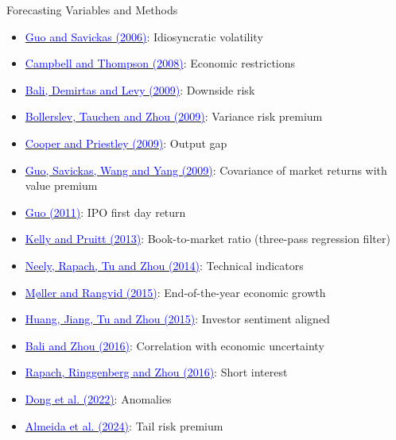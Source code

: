 \documentclass{beamer}
\begin{document}
\begin{frame}[allowframebreaks]{Forecasting Variables and Methods}
	\begin{itemize}
		\item \href{https://doi.org/10.1016/j.jfineco.2005.10.003}{\textcolor{blue}{Guo and Savickas (2006)}}: Idiosyncratic volatility
        \item \href{https://doi.org/10.1093/rfs/hhm055}{\textcolor{blue}{Campbell and Thompson (2008)}}: Economic restrictions
		\item \href{https://doi.org/10.1016/j.jfineco.2008.02.011}{\textcolor{blue}{Bali, Demirtas and Levy (2009)}}: Downside risk
		\item \href{https://doi.org/10.1093/rfs/hhp008}{\textcolor{blue}{Bollerslev, Tauchen and Zhou (2009)}}: Variance risk premium
		\item \href{https://doi.org/10.1093/rfs/hhp032}{\textcolor{blue}{Cooper and Priestley (2009)}}: Output gap
		\item \href{https://doi.org/10.1016/j.jfineco.2008.03.001}{\textcolor{blue}{Guo, Savickas, Wang and Yang (2009)}}: Covariance of market returns with value premium
		\item \href{https://doi.org/10.1093/rfs/hhr093}{\textcolor{blue}{Guo (2011)}}: IPO first day return
		\item \href{https://doi.org/10.1111/jofi.12060}{\textcolor{blue}{Kelly and Pruitt (2013)}}: Book-to-market ratio (three-pass regression filter)
		\item \href{https://doi.org/10.1287/mnsc.2013.1838}{\textcolor{blue}{Neely, Rapach, Tu and Zhou (2014)}}: Technical indicators
		\item \href{https://doi.org/10.1016/j.jfineco.2014.10.006}{\textcolor{blue}{Møller and Rangvid (2015)}}: End-of-the-year economic growth
              \item \href{https://doi.org/10.1093/rfs/hhu080}{\textcolor{blue}{Huang, Jiang, Tu and Zhou (2015)}}: Investor sentiment aligned
		\item \href{https://doi.org/10.1017/S0022109016000417}{\textcolor{blue}{Bali and Zhou (2016)}}: Correlation with economic uncertainty 
		
		\item \href{https://doi.org/10.1016/j.jfineco.2015.08.020}{\textcolor{blue}{Rapach, Ringgenberg and Zhou (2016)}}: Short interest
		\item \href{https://doi.org/10.1111/jofi.13099}{\textcolor{blue}{Dong et al. (2022)}}: Anomalies
          \item \href{https://doi.org/10.1017/S0022109023001199}{\textcolor{blue}{Almeida et al. (2024)}}: Tail risk premium
	\end{itemize}
\end{frame}
\end{document}
